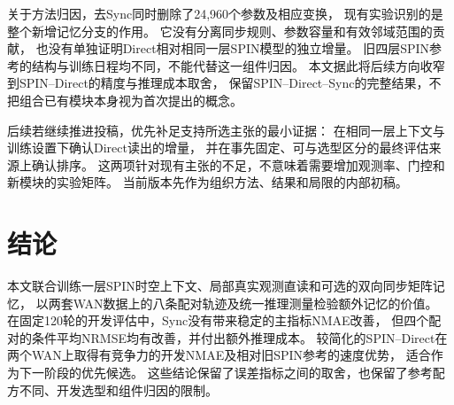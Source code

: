 \documentclass[conference,10pt,letterpaper]{IEEEtran}
\newcommand{\full}{SPIN--Direct--Sync}
\newcommand{\lite}{SPIN--Direct}
\begin{document}
关于方法归因，去Sync同时删除了24,960个参数及相应变换，
现有实验识别的是整个新增记忆分支的作用。
它没有分离同步规则、参数容量和有效邻域范围的贡献，
也没有单独证明Direct相对相同一层SPIN模型的独立增量。
旧四层SPIN参考的结构与训练日程均不同，不能代替这一组件归因。
本文据此将后续方向收窄到\lite 的精度与推理成本取舍，
保留\full 的完整结果，不把组合已有模块本身视为首次提出的概念。

后续若继续推进投稿，优先补足支持所选主张的最小证据：
在相同一层上下文与训练设置下确认Direct读出的增量，
并在事先固定、可与选型区分的最终评估来源上确认排序。
这两项针对现有主张的不足，不意味着需要增加观测率、门控和新模块的实验矩阵。
当前版本先作为组织方法、结果和局限的内部初稿。

\section{结论}
本文联合训练一层SPIN时空上下文、局部真实观测直读和可选的双向同步矩阵记忆，
以两套WAN数据上的八条配对轨迹及统一推理测量检验额外记忆的价值。
在固定120轮的开发评估中，Sync没有带来稳定的主指标NMAE改善，
但四个配对的条件平均NRMSE均有改善，并付出额外推理成本。
较简化的\lite 在两个WAN上取得有竞争力的开发NMAE及相对旧SPIN参考的速度优势，
适合作为下一阶段的优先候选。
这些结论保留了误差指标之间的取舍，也保留了参考配方不同、开发选型和组件归因的限制。


\end{document}
